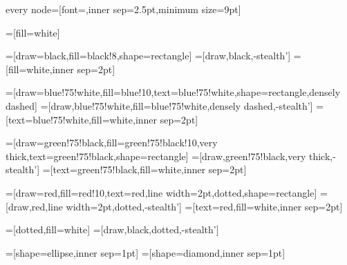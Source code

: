 \usepackage{tikz}
\usetikzlibrary{arrows,automata,positioning,er}

\tikzstyle every node=[font=\footnotesize\sffamily,inner sep=2.5pt,minimum size=9pt]

\newcommand{\red}{red}
\newcommand{\redfill}{\red!10}
\newcommand{\green}{green!75!black}
\newcommand{\greenfill}{\green!10}
\newcommand{\blue}{blue!75!white}
\newcommand{\bluefill}{blue!10}
\newcommand{\grey}{black!8}
=[fill=white]

=[draw=black,fill=\grey,shape=rectangle]
=[draw,black,-stealth']
=[fill=white,inner sep=2pt]

=[draw=\blue,fill=\bluefill,text=\blue,shape=rectangle,densely dashed]
=[draw,\blue,fill=\blue,densely dashed,-stealth']
=[text=\blue,fill=white,inner sep=2pt]

=[draw=\green,fill=\greenfill,very thick,text=\green,shape=rectangle]
=[draw,\green,very thick,-stealth']
=[text=\green,fill=white,inner sep=2pt]

=[draw=\red,fill=\redfill,text=\red,line width=2pt,dotted,shape=rectangle]
=[draw,\red,line width=2pt,dotted,-stealth']
=[text=\red,fill=white,inner sep=2pt]

=[dotted,fill=white]
=[draw,black,dotted,-stealth']

=[shape=ellipse,inner sep=1pt]
=[shape=diamond,inner sep=1pt]

\newcommand{\ml}[1]{
\begin{tabular}{@{}l@{}}#1\vspace{-2pt}\end{tabular}
}
